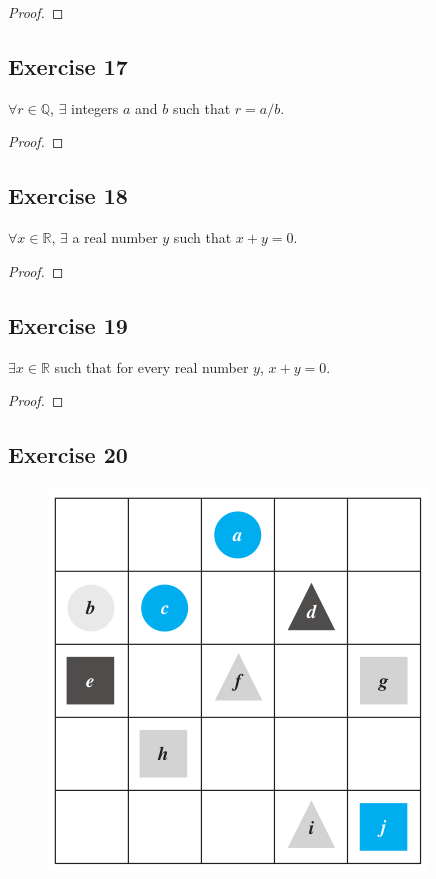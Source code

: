 \documentclass[14pt]{extarticle}
\newcommand{\R}{\mathbb{R}}
\newcommand{\Q}{\mathbb{Q}}
\newcommand{\fa}{\forall}
\newcommand{\te}{\exists}
\begin{document}
\begin{proof}

\end{proof}

\subsection{Exercise 17}
$\fa r \in \Q$, $\te$ integers $a$ and $b$ such that $r = a/b$.

\begin{proof}

\end{proof}

\subsection{Exercise 18}
$\fa x \in \R$, $\te$ a real number $y$ such that $x + y = 0$.
\begin{proof}

\end{proof}

\subsection{Exercise 19}
$\te x \in \R$ such that for every real number $y$, $x + y = 0$.
\begin{proof}

\end{proof}

\subsection{Exercise 20}
\begin{figure}[ht!]
\centering
\includegraphics[scale=0.4]{../images/3.3.1.png}
\end{figure}
\end{document}
